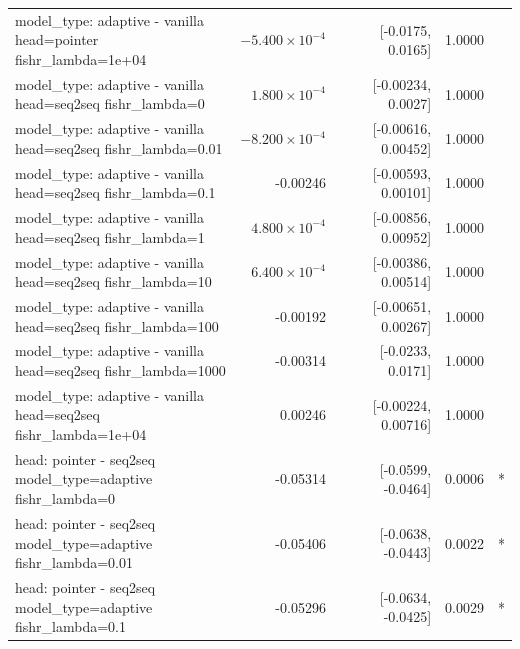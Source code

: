 \documentclass[10pt]{article}
\makeatletter
\newcommand{\stackcell}[1]{\begin{tabular}[t]{@{}l@{}}#1\end{tabular}}
\makeatother
\begin{document}
{\begin{longtable}{lrrrl}
\stackcell{model\_type: adaptive - vanilla\\\footnotesize head=pointer fishr\_lambda=1e+04 } & $-5.400\times10^{-4}$ & [-0.0175, 0.0165] & 1.0000 & \\
\stackcell{model\_type: adaptive - vanilla\\\footnotesize head=seq2seq fishr\_lambda=0 } & $1.800\times10^{-4}$ & [-0.00234, 0.0027] & 1.0000 & \\
\stackcell{model\_type: adaptive - vanilla\\\footnotesize head=seq2seq fishr\_lambda=0.01 } & $-8.200\times10^{-4}$ & [-0.00616, 0.00452] & 1.0000 & \\
\stackcell{model\_type: adaptive - vanilla\\\footnotesize head=seq2seq fishr\_lambda=0.1 } & -0.00246 & [-0.00593, 0.00101] & 1.0000 & \\
\stackcell{model\_type: adaptive - vanilla\\\footnotesize head=seq2seq fishr\_lambda=1 } & $4.800\times10^{-4}$ & [-0.00856, 0.00952] & 1.0000 & \\
\stackcell{model\_type: adaptive - vanilla\\\footnotesize head=seq2seq fishr\_lambda=10 } & $6.400\times10^{-4}$ & [-0.00386, 0.00514] & 1.0000 & \\
\stackcell{model\_type: adaptive - vanilla\\\footnotesize head=seq2seq fishr\_lambda=100 } & -0.00192 & [-0.00651, 0.00267] & 1.0000 & \\
\stackcell{model\_type: adaptive - vanilla\\\footnotesize head=seq2seq fishr\_lambda=1000 } & -0.00314 & [-0.0233, 0.0171] & 1.0000 & \\
\stackcell{model\_type: adaptive - vanilla\\\footnotesize head=seq2seq fishr\_lambda=1e+04 } & 0.00246 & [-0.00224, 0.00716] & 1.0000 & \\
\stackcell{head: pointer - seq2seq\\\footnotesize model\_type=adaptive fishr\_lambda=0 } & -0.05314 & [-0.0599, -0.0464] & 0.0006 & *\\
\stackcell{head: pointer - seq2seq\\\footnotesize model\_type=adaptive fishr\_lambda=0.01 } & -0.05406 & [-0.0638, -0.0443] & 0.0022 & *\\
\stackcell{head: pointer - seq2seq\\\footnotesize model\_type=adaptive fishr\_lambda=0.1 } & -0.05296 & [-0.0634, -0.0425] & 0.0029 & *\\

\end{longtable}}
\end{document}
